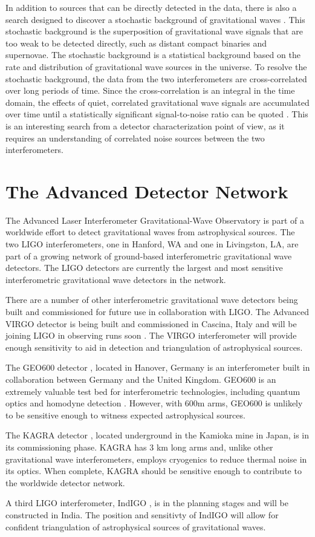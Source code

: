 In addition to sources that can be directly detected in the data, there is 
also a search designed to discover a stochastic background of gravitational waves
 \cite{Collaboration:S4Stochastic,GW150914-STOCHASTIC}. 
This stochastic background is the superposition of gravitational wave signals that 
are too weak to be detected directly, such as distant compact binaries and 
supernovae. The stochastic background is a statistical background based on the 
rate and distribution of gravitational wave sources in the universe. To resolve 
the stochastic background, the data from the two interferometers are 
cross-correlated over long periods of time. Since the cross-correlation 
is an integral in the time domain, the effects of quiet, correlated 
gravitational wave signals are accumulated over time until a statistically 
significant signal-to-noise ratio can be quoted \cite{Allen1999Stoch}. 
This is an interesting search from a detector characterization point of view, 
as it requires an understanding of correlated noise sources between the two 
interferometers. 

\section{The Advanced Detector Network}

The Advanced Laser Interferometer Gravitational-Wave Observatory is 
part of a worldwide effort to detect gravitational waves from astrophysical 
sources. The two LIGO interferometers, one in Hanford, WA and one in 
Livingston, LA, are part of a growing network of ground-based interferometric 
gravitational wave detectors. The LIGO detectors are currently the largest 
and most sensitive interferometric gravitational wave detectors in the 
network.

There are a number of other interferometric gravitational wave detectors 
being built and commissioned for future use in collaboration with LIGO.
The Advanced VIRGO detector is being built and commissioned in Cascina, Italy 
and will be joining LIGO in observing runs soon 
\cite{aVIRGO}. 
The VIRGO interferometer will provide enough 
sensitivity to aid in detection and triangulation of astrophysical sources.

The GEO600 detector \cite{GEO600}, located in Hanover, Germany is an 
interferometer built in 
collaboration between Germany and the United Kingdom. 
GEO600 is an extremely valuable test bed for interferometric technologies,
including quantum optics \cite{Squeezing} and homodyne detection \cite{DCReadout}. 
However, with 600m arms, GEO600 
is unlikely to be sensitive enough to witness expected astrophysical sources.

The KAGRA detector \cite{KAGRA}, located underground in the Kamioka mine in Japan, 
is in its commissioning phase. KAGRA has 3 km long arms and, 
unlike other gravitational wave interferometers, employs cryogenics to 
reduce thermal noise in its optics. When complete, KAGRA should be 
sensitive enough to contribute to the worldwide detector network.

A third LIGO interferometer, IndIGO \cite{IndIGO}, is in the planning stages and will be 
constructed in India. The position and sensitivty of IndIGO will allow for 
confident triangulation of astrophysical sources of gravitational waves.
